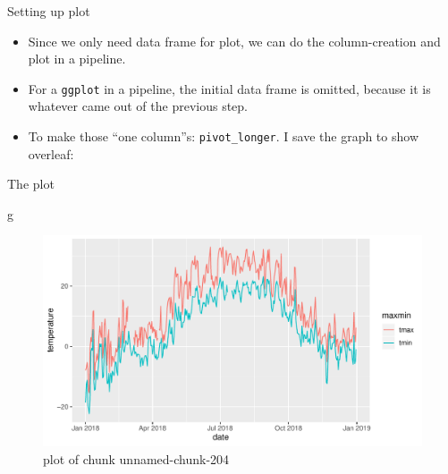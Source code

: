 \documentclass[
  ignorenonframetext,
]{beamer}
\newenvironment{Shaded}{\begin{snugshade}}{\end{snugshade}}
\newcommand{\DataTypeTok}[1]{\textcolor[rgb]{0.13,0.29,0.53}{#1}}
\newcommand{\KeywordTok}[1]{\textcolor[rgb]{0.13,0.29,0.53}{\textbf{#1}}}
\newcommand{\NormalTok}[1]{#1}
\newcommand{\OperatorTok}[1]{\textcolor[rgb]{0.81,0.36,0.00}{\textbf{#1}}}
\newcommand{\StringTok}[1]{\textcolor[rgb]{0.31,0.60,0.02}{#1}}
\providecommand{\tightlist}{%
  \setlength{\itemsep}{0pt}\setlength{\parskip}{0pt}}
\begin{document}
\begin{frame}[fragile]{Setting up plot}
\protect\hypertarget{setting-up-plot}{}

\begin{itemize}
\tightlist
\item
  Since we only need data frame for plot, we can do the column-creation
  and plot in a pipeline.
\item
  For a \texttt{ggplot} in a pipeline, the initial data frame is
  omitted, because it is whatever came out of the previous step.
\item
  To make those ``one column''s: \texttt{pivot\_longer}. I save the
  graph to show overleaf:
\end{itemize}

\begin{Shaded}
\end{Shaded}

\end{frame}

\begin{frame}[fragile]{The plot}
\protect\hypertarget{the-plot}{}

\begin{Shaded}
\begin{Highlighting}[]
\NormalTok{g}
\end{Highlighting}
\end{Shaded}

\begin{figure}
\centering
\includegraphics{figure/unnamed-chunk-204-1.pdf}
\caption{plot of chunk unnamed-chunk-204}
\end{figure}

\end{frame}
\end{document}
